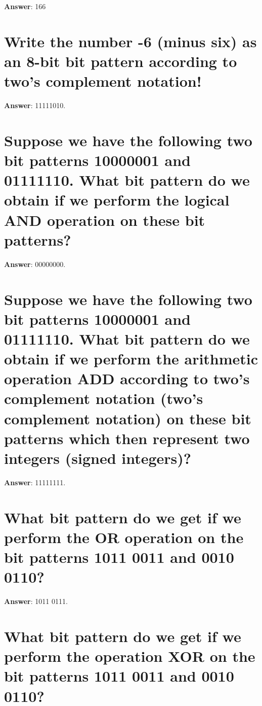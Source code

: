 \documentclass[a4paper,11pt,oneside]{book}
\begin{document}
\begin{sloppypar}
\label{q:401:sa:en:True}

\textbf{Answer}: 166



\section{Write the number -6 (minus six) as an 8-bit bit pattern according to two's complement notation!}

\label{q:402:sa:en:True}

\textbf{Answer}: 11111010.



\section{Suppose we have the following two bit patterns 10000001 and 01111110. What bit pattern do we obtain if we perform the logical AND operation on these bit patterns?}

\label{q:403:sa:en:True}

\textbf{Answer}: 00000000.



\section{Suppose we have the following two bit patterns 10000001 and 01111110. What bit pattern do we obtain if we perform the arithmetic operation ADD according to two's complement notation (two's complement notation) on these bit patterns which then represent two integers (signed integers)?}

\label{q:404:sa:en:True}

\textbf{Answer}: 11111111.



\section{What bit pattern do we get if we perform the OR operation on the bit patterns 1011 0011 and 0010 0110?}

\label{q:405:sa:en:True}

\textbf{Answer}: 1011 0111.



\section{What bit pattern do we get if we perform the operation XOR on the bit patterns 1011 0011 and 0010 0110?}


\end{sloppypar}
\end{document}
